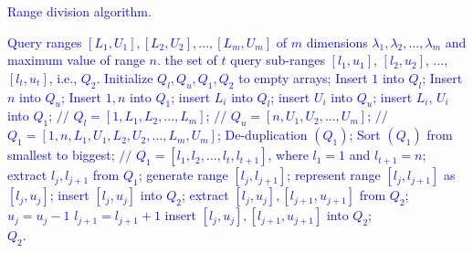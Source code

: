 \documentclass[IEEE JOURNAL OF BIOMEDICAL AND HEALTH INFORMATICS]{IEEEtran}
\begin{document}
{\begin{algorithm}[h]  
	\caption{\textcolor{blue}{Range division algorithm}.}
	\label{algorithm}  
	\begin{algorithmic}[1]
		\Require  
		\textcolor{blue}{Query ranges $[L_1, U_1], [L_2, U_2], ..., [L_m, U_m]$ of $m$ dimensions $\lambda_1, \lambda_2, ..., \lambda_m$ and maximum value of range $n$.} 
		\Ensure \textcolor{blue}{the set of $t$ query sub-ranges $[l_1, u_1]$, $[l_2, u_2]$, ..., $[l_t, u_t]$, i.e., $Q_2$.}  
		\State \textcolor{blue}{Initialize $Q_l, Q_u, Q_1, Q_2$ to empty arrays;}
		\State \textcolor{blue}{Insert $1$ into $Q_l$;}
		\State \textcolor{blue}{Insert $n$ into $Q_u$;}
		\State \textcolor{blue}{Insert $1, n$ into $Q_1$;}
		\For{\textcolor{blue}{each $i\in [1,m]$}}
		\State \textcolor{blue}{insert $L_i$ into $Q_l$;}
		\State \textcolor{blue}{insert $U_i$ into $Q_u$;}
		\State \textcolor{blue}{insert $L_i$, $U_i$ into $Q_1$;}   
		\EndFor 
		\State \textcolor{blue}{$//$ $Q_l=[1, L_1, L_2, ..., L_m]$;}
		\State \textcolor{blue}{$//$ $Q_u=[n, U_1, U_2, ..., U_m]$;}
		\State \textcolor{blue}{$//$ $Q_1=[1, n, L_1, U_1, L_2, U_2, ..., L_m, U_m]$;}
		\State \textcolor{blue}{De-duplication $(Q_1)$;}
		\State \textcolor{blue}{Sort $(Q_1)$ from smallest to biggest;}
		\State \textcolor{blue}{$//$ $Q_1=[l_1, l_2, ..., l_t, l_{t+1}]$, where $l_1=1$ and $l_{t+1}=n$;}
		\For{\textcolor{blue}{each $j \in [1, t]$}}
		\State \textcolor{blue}{extract $l_j, l_{j+1}$ from $Q_1$;}
		\State \textcolor{blue}{generate range $[l_j, l_{j+1}]$;}
		\State \textcolor{blue}{represent range $[l_j, l_{j+1}]$ as $[l_j, u_j]$;}
		\State \textcolor{blue}{insert $[l_j, u_j]$ into $Q_2$;}
		\EndFor
		\For {\textcolor{blue}{each $j \in [1, t]$}}
		\State \textcolor{blue}{extract $[l_j, u_j], [l_{j+1}, u_{j+1}]$ from $Q_2$;}
		\While {\textcolor{blue}{$[l_j, u_{j}] \cap [l_{j+1}, u_{j+1}] \neq \emptyset$}}
		\If {\textcolor{blue}{$u_j \in Q_l$}}
		\State \textcolor{blue}{$u_j=u_j-1$}
		\EndIf
		\If {\textcolor{blue}{$u_j \in Q_u$}}
		\State \textcolor{blue}{$l_{j+1}=l_{j+1}+1$}
		\EndIf
		\EndWhile
		\State \textcolor{blue}{insert $[l_j, u_j], [l_{j+1}, u_{j+1}]$ into $Q_2$;}
		\EndFor\\
		\Return \textcolor{blue}{$Q_2$.}    
	\end{algorithmic}  
\end{algorithm} 


}
\end{document}
